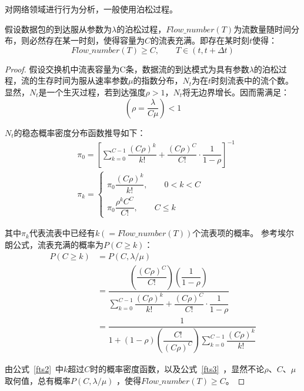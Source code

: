 对网络领域进行行为分析，一般使用泊松过程。

\begin{theorem}%
	假设数据包的到达服从参数为$\lambda$的泊松过程，$ Flow\_number(T) $为流数量随时间分布，则必然存在某一时刻，使得容量为$C$的流表充满。即存在某时刻$t$使得：
	\begin{equation}
	Flow\_number(T) \geq C, \qquad T \in (t,t+\Delta t)
	\end{equation}
	
\end{theorem}


\begin{proof}
	假设交换机中流表容量为C条，数据流的到达模式为具有参数$\lambda$的泊松过程，流的生存时间为服从速率参数$\mu$的指数分布，$N_t$为在$t$时刻流表中的流个数。显然，$N_t$是一个生灭过程，若到达强度$\rho>1$，$N_t$将无边界增长。因而需满足：
	\begin{equation}
	(\rho=\dfrac{\lambda}{C\mu})<1
	\end{equation}
	
	$N_t$的稳态概率密度分布函数推导如下：
	\begin{align}\label{fts1}
	&\pi_0 = [\sum_{k=0}^{C-1}\dfrac{(C\rho)^k}{k!}+\dfrac{(C\rho)^C}{C!}\cdot\dfrac{1}{1-\rho}]^{-1}  \\
	&\pi_k = \begin{cases}\label{fts2}
	\pi_0\dfrac{(C\rho)^k}{k!}, \qquad 0<k<C \\
	\pi_0\dfrac{\rho^kC^C}{C!}, \qquad C \leq k
	\end{cases}
	\end{align}
	
	其中$\pi_k$代表流表中已经有$k(=Flow\_number(T))$个流表项的概率。
	参考埃尔朗公式，流表充满的概率为$ P(C\geq  k) $：
	\begin{align}\label{fts3}
	P(C\geq  k) &= P(C,\lambda/\mu) \nonumber \\
	&=\dfrac {\left( \dfrac {\left( C\rho\right)^C}{C!}\right) \left( \dfrac {1}{1-\rho }\right) }{\sum ^{C-1}_{k=0}\dfrac {\left( C\rho\right) ^{k}}{k!}+\dfrac {\left( C\rho\right) ^{C}}{C!}\cdot\dfrac {1}{1-\rho }} \nonumber  \\
	&=\dfrac {1}{1+\left( 1-\rho \right) \left( \dfrac {C!}{(C\rho)^{C}}\right) \sum ^{C-1}_{k=0}\dfrac {(C\rho)^{k}}{k!}}
	\end{align}	
	
	由公式~\ref{fts2}~中$ k $超过$ C $时的概率密度函数，以及公式~\ref{fts3}~，显然不论$ \rho $、$ C $、$\mu$取何值，总有概率$ P(C,\lambda/\mu) $ ，使得$ Flow\_number(T) \geq C $。
\end{proof}

